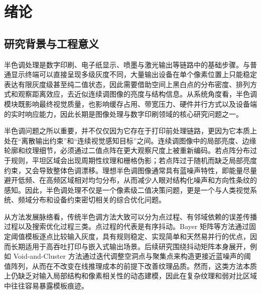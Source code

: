 \documentclass[thesis]{../zstucs-graduation-project}
\begin{document}
\begin{abstract}
Overall, the thesis provides a relatively complete discussion of why reinforcement learning is appropriate for discrete halftoning decisions, how perceptual and spectral constraints can be integrated into training, and how deployment stability should be explicitly validated rather than assumed. These findings offer a practical basis for further extensions toward color halftoning, multi-level output devices, and device-aware adaptation.

\par\noindent\textbf{Key words: }halftoning, reinforcement learning, blue noise, policy network, image processing
\end{abstract}

\clearpage
\tableofcontents

\section{绪论}

\subsection{研究背景与工程意义}
半色调处理是数字印刷、电子纸显示、喷墨与激光输出等链路中的基础步骤。与普通显示终端可以直接呈现多级灰度不同，大量输出设备在单个像素位置上只能稳定表达有限灰度级甚至纯二值状态，因此需要借助空间上黑白点的分布密度、排列方式和观察距离效应，去近似连续调图像的亮度与结构信息\cite{LAU2008Modern,ULICHNEY1988Dithering}。从系统角度看，半色调模块既影响最终视觉质量，也影响缓存占用、带宽压力、硬件并行方式以及设备端的实时响应能力，因此长期是图像处理与数字印刷领域的核心研究问题之一。

半色调问题之所以重要，并不仅仅因为它存在于打印前处理链路，更因为它本质上处在“离散输出约束”和“连续视觉感知目标”之间。连续调图像中的局部亮度、边缘轮廓和纹理细节，必须通过二值点阵在更大观察尺度上被重新编码。若点阵分布过于规则，平坦区域会出现周期性纹理和栅格伪影；若点阵过于随机而缺乏局部亮度约束，又会导致整体色调漂移。理想半色调图像通常具有蓝噪声特性，即能量尽量避开低频、在高频区域相对均匀分布，从而减少人眼对结构化噪声和方向性条纹的感知\cite{ULICHNEY1988Dithering}。因此，半色调处理不仅是一个像素级二值决策问题，更是一个与人类视觉系统、频域分布和设备约束密切相关的综合优化问题。

从方法发展脉络看，传统半色调方法大致可以分为点过程、有邻域依赖的误差传播过程以及搜索优化过程三类。点过程的代表是有序抖动。Bayer 矩阵等方法通过固定阈值模板逐点比较输入灰度，具有规则稳定、实现简单和天然易并行的优点，因而长期适用于高吞吐打印与嵌入式输出场景\cite{BAYER1973An}。后续研究围绕抖动矩阵本身展开，例如 Void-and-Cluster 方法通过迭代调整空洞点与聚集点来构造更接近蓝噪声的阈值阵列，从而在不改变在线推理成本的前提下改善纹理品质\cite{ULICHNEY1993Void}。然而，这类方法本质上仍缺乏对输入局部结构和像素相关性的动态建模，因此在复杂纹理和弱对比区域中往往容易暴露模板痕迹。
\end{document}
